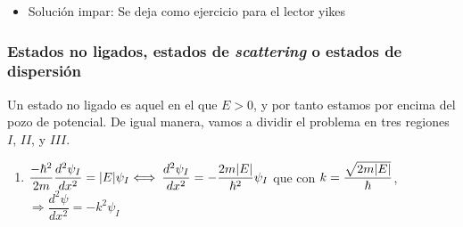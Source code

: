 \documentclass{report}
\begin{document}
{\begin{itemize}
\begin{itemize}
                    \item $\psi^\prime_{II}(x=a)=\psi_{III}^\prime(x=a)\Longleftrightarrow -Cl\sin(la)=-kGe^{-ka}
                          \Longleftrightarrow\boxed{l\tan(la)=k}$ 

                          La llamada condición de cuantización de la energía, que no tiene solución analítica 
                          y se debe resolver o numéricamente o gráficamente. Vamos a reescribirla para poder
                          representarla:\\

                          Definición de variables:\\
                          $\xi=ka$\hspace{0.5cm}$z=al$\hspace{0.5cm}$\xi^2+z^2=z_0^2\Leftrightarrow\xi=
                          \sqrt{z_0^2-z^2}$\\

                          Desarrollo:\\
                          $l\tan(la)=k \Longleftrightarrow al\tan(la)=ka \Longleftrightarrow z\tan(s)=\xi$
                          $\Longleftrightarrow k^2+l^2=\dfrac{2m\abs{E}}{\hbar^2}+\dfrac{2m(V_0-\abs{E})}{\hbar^2}=
                          \dfrac{2mV_0}{\hbar^2} \Longleftrightarrow (ak)^2+(al)^2=\dfrac{2mV_0a^2}{\hbar^2}=z_0^2
                          \Longleftrightarrow \boxed{z_0^2=\dfrac{2mV_0a^2}{\hbar^2}}\Longleftrightarrow z\tan(z)=
                          \sqrt{z_0^2-z^2}\Longleftrightarrow\boxed{\tan(z)=\sqrt{\left(\dfrac{z_0}{2}\right)^2-1}}$

                  \end{itemize}
            \item Solución impar:
                  Se deja como ejercicio para el lector yikes
          \end{itemize}

        \subsubsection*{Estados no ligados, estados de \textit{scattering} o estados de dispersión}
          Un estado no ligado es aquel en el que $E>0$, y por tanto estamos por encima del pozo de potencial.
          De igual manera, vamos a dividir el problema en tres regiones $I$, $II$, y $III$.
          \begin{enumerate}
            \item $\dfrac{-\hbar^2}{2m}\dfrac{d^2\psi_I}{dx^2}=\lvert E\rvert\psi_I\Longleftrightarrow$
                  $\dfrac{d^2\psi_I}{dx^2}=-\dfrac{2m\lvert E\rvert}{\hbar^2}\psi_I$ que con $k=
                  \dfrac{\sqrt{2m\lvert E\rvert}}{\hbar}$, $\Longrightarrow\dfrac{d^2\psi}{dx^2}=-k^2\psi_I$\\
          

\end{enumerate}}
\end{document}
